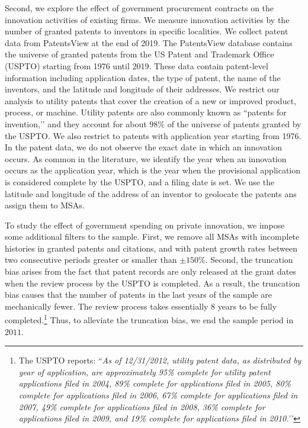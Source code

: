 \documentclass[dv_diss_main.tex]{subfiles}
\begin{document}
Second, we explore the effect of government procurement contracts on the innovation activities of existing firms. We measure innovation activities by the number of granted patents to inventors in specific localities. We collect patent data from PatentsView at the end of 2019. The PatentsView database contains the universe of granted patents from the US Patent and Trademark Office (USPTO) starting from 1976 until 2019. These data contain patent-level information including application dates, the type of patent, the name of the inventors, and the latitude and longitude of their addresses. We restrict our analysis to utility patents that cover the creation of a new or improved product, process, or machine. Utility patents are also commonly known as ``patents for invention,’’ and they account for about $98\%$ of the universe of patents granted by the USPTO. We also restrict to patents with application year starting from 1976. In the patent data, we do not observe the exact date in which an innovation occurs. As common in the literature, we identify the year when an innovation occurs as the application year, which is the year when the provisional application is considered complete by the USPTO, and a filing date is set. We use the latitude and longitude of the address of an inventor to geolocate the patents ans assign them to MSAs.

To study the effect of government spending on private innovation, we impose some additional filters to the sample. First, we remove all MSAs with incomplete histories in granted patents and citations, and with patent growth rates between two consecutive periods greater or smaller than $\pm 150\%$. Second, the truncation bias arises from the fact that patent records are only released at the grant dates when the review process by the USPTO is completed. As a result, the truncation bias causes that the number of patents in the last years of the sample are mechanically fewer. The review process takes essentially $8$ years to be fully completed.\footnote{The USPTO reports:  ``\textit{As of 12/31/2012, utility patent data, as distributed by year of application, are approximately 95\% complete for utility patent applications filed in 2004, 89\% complete for applications filed in 2005, 80\% complete for applications filed in 2006, 67\% complete for applications filed in 2007, 49\% complete for applications filed in 2008, 36\% complete for applications filed in 2009, and 19\% complete for applications filed in 2010.}’’} Thus, to alleviate the truncation bias, we end the sample period in $2011$. 
\end{document}
